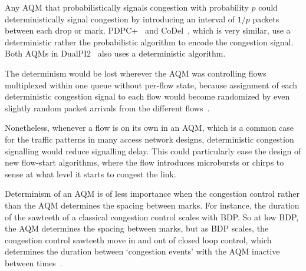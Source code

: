 Any AQM that probabilistically signals congestion with probability \(p\) could deterministically signal congestion by introducing an interval of \(1/p\) packets between each drop or mark. PDPC+~\cite{Sagfors03:PDPC_vary} and CoDel~\cite{Nichols12:CoDel}, which is very similar, use a deterministic rather the probabilistic algorithm to encode the congestion signal. Both AQMs in DualPI2~\cite[Appx.\ A]{Briscoe15e:DualQ-Coupled-AQM_ID} also uses a deterministic algorithm.

The determinism would be lost wherever the AQM was controlling flows multiplexed within one queue without per-flow state, because assignment of each deterministic congestion signal to each flow would become randomized by even slightly random packet arrivals from the different flows~\cite{Briscoe15d:PIE_rvw}.

Nonetheless, whenever a flow is on its own in an AQM, which is a common case for the traffic patterns in many access network designs,  deterministic congestion signalling would reduce signalling delay. This could particularly ease the design of new flow-start algorithms, where the flow introduces microbursts or chirps to sense at what level it starts to congest the link.

Determinism of an AQM is of less importance when the congestion control rather than the AQM determines the spacing between marks. For instance, the duration of the sawteeth of a classical congestion control scales with BDP. So at low BDP, the AQM determines the spacing between marks, but as BDP scales, the congestion control sawteeth move in and out of closed loop control, which determines the duration between `congestion events' with the AQM inactive between times~\cite[\S\,3.3]{Briscoe21c:pi2param}.